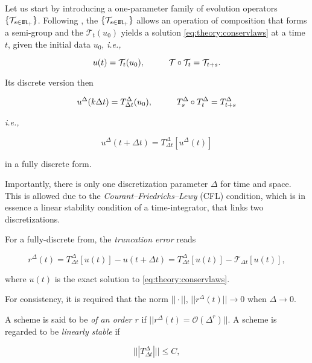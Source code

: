 Let us start by introducing a one-parameter family of evolution operators $\{\mathcal{T}_{s\in\text{I\!R}_+}\}$. 
Following \cite{Kruzkov:1970}, the $\{\mathcal{T}_{s\in\text{I\!R}_+}\}$ allows an operation of composition that forms a semi-group and the $\mathcal{T}_t(u_0)$ yields a solution \ref{eq:theory:conservlaws} at a time $t$, given the initial data $u_0$, \textit{i.e.,}

\begin{equation}
u(t) = \mathcal{T}_t(u_0), \hspace{10mm} \mathcal{T}\circ\mathcal{T}_t = \mathcal{T}_{t+s}.
\end{equation}

Its discrete version then

\begin{equation}
u^{\Delta}(k\Delta t) = T^{\Delta}_{\Delta t}(u_0), \hspace{10mm} T^{\Delta}_s\circ T^{\Delta}_t = T^{\Delta} _{t+s}
\end{equation}

\textit{i.e.,}

\begin{equation}
u^{\Delta}(t+\Delta t) = T^{\Delta} _{\Delta t}[u^{\Delta}(t)]
\end{equation}

in a fully discrete form.

Importantly, there is only one discretization parameter $\Delta$ for time and space. 
This is allowed due to the \textit{Courant–Friedrichs–Lewy} (CFL) condition, which is in essence a linear stability condition of a time-integrator, that links two discretizations. 

For a fully-discrete from, the \textit{truncation error} reads 

\begin{equation}
r^{\Delta}(t) = T^{\Delta}_{\Delta t}[u(t)] - u(t + \Delta t) = T^{\Delta}_{\Delta t}[u(t)] - \mathcal{T}_{\Delta t}[u(t)],
\end{equation}

where $u(t)$ is the exact solution to \ref{eq:theory:conservlaws}. 

For consistency, it is required that the norm $||\cdot||$, $||r^{\Delta}(t)||\rightarrow 0$ when $\Delta\rightarrow 0$. 

A scheme is said to be \textit{ of an order $r$ } if $||r^{\Delta}(t) = \mathcal{O}(\Delta^r)||$. 
A scheme is regarded to be \textit{linearly stable} if 

\begin{equation}
|||T^{\Delta}_{\Delta t}||| \leq C,
\end{equation}

